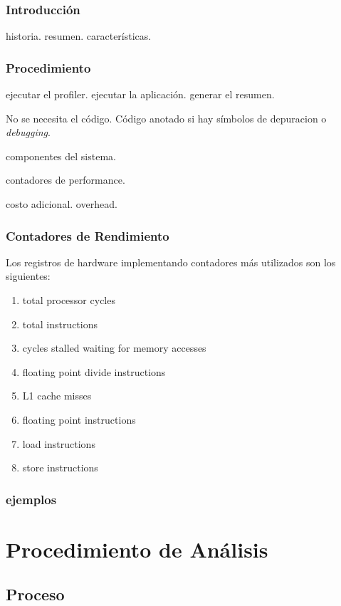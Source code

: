 \documentclass[a4paper]{report}
\begin{document}
\subsection{Introducci\'on}

historia. resumen. caracter\'isticas. 

\subsection{Procedimiento}

ejecutar el profiler. ejecutar la aplicaci\'on. generar el resumen.

No se necesita el c\'odigo. C\'odigo anotado si hay s\'imbolos de depuracion o
{\it debugging}.

componentes del sistema.

contadores de performance.

costo adicional. overhead.

\subsection{Contadores de Rendimiento}

Los registros de hardware implementando contadores m\'as utilizados son los
siguientes:

\begin{enumerate}
\item total processor cycles
\item total instructions
\item cycles stalled waiting for memory accesses
\item floating point divide instructions
\item L1 cache misses
\item floating point instructions
\item load instructions
\item store instructions
\end{enumerate}

\subsection{ejemplos}

\chapter{Procedimiento de An\'alisis}

\section{Proceso}
\end{document}
